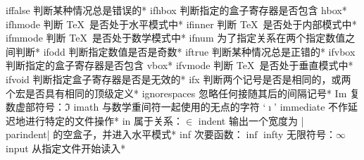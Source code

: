 \capcs iffalse {判断某种情况总是错误的}*{\@iffalse}
\capcs ifhbox {判断指定的盒子寄存器是否包含 hbox}*{\@ifhbox}
\capcs ifhmode {判断 \TeX\ 是否处于水平模式中}*{\@ifhmode}
\capcs ifinner {判断 \TeX\ 是否处于内部模式中}*{\@ifinner}
\capcs ifmmode {判断 \TeX\ 是否处于数学模式中}*{\@ifmmode}
\capcs ifnum {为了指定关系在两个指定数值之间判断}*{\@ifnum}
\capcs ifodd {判断指定数值是否是奇数}*{\@ifodd}
\capcs iftrue {判断某种情况总是正错的}*{\@iftrue}
\capcs ifvbox {判断指定的盒子寄存器是否包含 vbox}*{\@ifvbox}
\capcs ifvmode {判断 \TeX\ 是否处于垂直模式中}*{\@ifvmode}
\capcs ifvoid {判断指定盒子寄存器是否是无效的}*{\@ifvoid}
\capcs ifx {判断两个记号是否是相同的，或两个宏是否具有相同的顶级定义}*{\@ifx}
\capcs ignorespaces {忽略任何接随其后的间隔记号}*{}
\capcs Im {复数虚部符号：$\Im$}{}{}
\capcs imath {与数学重间符一起使用的无点的字符 `$\imath$'}{}{}
\capcs immediate {不作延迟地进行特定的文件操作}*{}
\capcs in {属于关系：$\in$}{}{}
\capcs indent {输出一个宽度为 |\\parindent| 的空盒子，并进入水平模式}*{}
\capcs inf {次要函数：$\inf$}{}{}
\capcs infty {无限符号：$\infty$}{}{}
\capcs input {从指定文件开始读入}*{}

